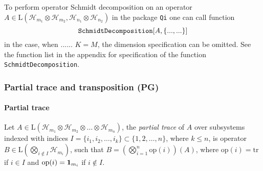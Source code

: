 \documentclass[11pt,a4paper]{article}
\newcommand{\qi}{\texttt{Qi}}
\newcommand{\res}{\mathrm{res}}
\newcommand{\ket}[1]{\ensuremath{|#1\rangle}}
\newcommand{\bra}[1]{\ensuremath{\langle#1|}}
\newcommand{\ketbra}[2]{\ensuremath{\ket{#1}\bra{#2}}}
\newcommand{\Hilb}[1]{\mathcal{H}_{#1}}
\newcommand{\Lin}{\mathrm{L}}
\newcommand{\tr}{\mathrm{tr}}
\newcommand{\1}{{\bf 1}}
\newcommand{\fname}[1]{\text{\texttt{#1}}}
\begin{document}
To perform operator Schmidt decomposition on an operator $A \in
\Lin(\Hilb{m_1}\otimes \Hilb{m_2},\Hilb{n_1}\otimes \Hilb{n_2})$ in the package
\qi{} one can call function
\begin{equation}
\fname{SchmidtDecomposition}[ A, \{... , ... \}]
\end{equation} 
in the case, when ...... $K=M$, the dimension specification can be omitted. See
the function list in the appendix for specification of the function
\texttt{SchmidtDecomposition}.


\subsubsection{Partial trace and transposition (PG)}

\paragraph{Partial trace}
Let $A\in \Lin(\Hilb{m_1}\otimes \Hilb{m_2}\otimes \ldots \otimes \Hilb{m_n})$,
the \emph{partial trace} of $A$ over subsystems indexed with indices $I=\{i_1,
i_2, \ldots, i_k\}\subset \{1,2,\ldots, n\}$, where $k\leq n$, is operator $B\in
\Lin(\bigotimes_{i\notin I} \Hilb{m_i})$, such that $B=(\bigotimes_{i=1}^{n}
\mathrm{op}(i))(A)$, where $\mathrm{op}(i)=\tr$ if $i\in I$ and
$\mathrm{op}(i)=\1_{m_i}$ if $i\notin I$.
\end{document}
